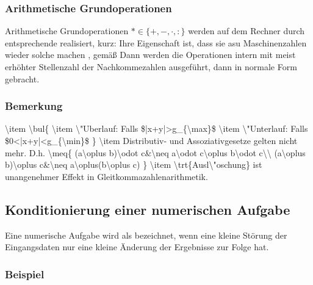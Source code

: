 \subsubsection*{Arithmetische Grundoperationen}
Arithmetische Grundoperationen $*\in\{+,-,\cdot,:\}$ werden auf dem Rechner durch entsprechende  realisiert, kurz:
Ihre Eigenschaft ist, dass sie asu Maschinenzahlen wieder solche machen , gem\"a\ss{}
Dann werden die Operationen intern mit meist erh\"ohter Stellenzahl der Nachkommezahlen ausgef\"uhrt, dann in normale Form gebracht.
\subsubsection{Bemerkung}
\num{
\item
    \bul{
    \item \"Uberlauf: Falls $|x+y|>g_{\max}$
    \item \"Unterlauf: Falls $0<|x+y|<g_{\min}$
    }
\item Distributiv- und Assoziativgesetze gelten nicht mehr. D.h.
    \meq{
        (a\oplus b)\odot c&\neq a\odot c\oplus b\odot c\\
        (a\oplus b)\oplus c&\neq a\oplus(b\oplus c)
    }
\item \trt{Ausl\"oschung} ist unangenehmer Effekt in Gleitkommazahlenarithmetik.
}
 \weg
\subsection{Konditionierung einer numerischen Aufgabe}
Eine numerische Aufgabe wird als  bezeichnet, wenn eine kleine St\"orung der Eingangsdaten nur eine kleine \"Anderung der Ergebnisse zur Folge hat.
\subsubsection{Beispiel} \weg

